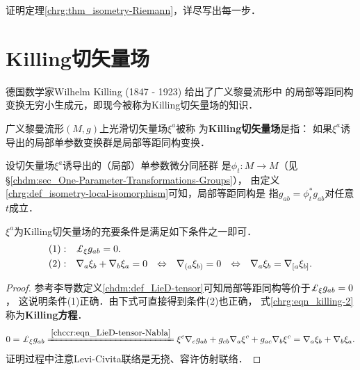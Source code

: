 \begin{exercise}
	证明定理\ref{chrg:thm_isometry-Riemann}，详尽写出每一步．
\end{exercise}



\section{Killing切矢量场}\label{chrg:sec_killing}
德国数学家Wilhelm Killing (1847 - 1923) 给出了广义黎曼流形中
的局部等距同构变换无穷小生成元，即现今被称为{Killing切矢量场}的知识．

\begin{definition}\label{chrg:def_killing}
    广义黎曼流形$(M,g)$上光滑切矢量场$\xi^a$被称
    为{\bfseries \heiti Killing切矢量场}是指：
    如果$\xi^a$诱导出的局部单参数变换群是局部等距同构变换．
\end{definition}
设切矢量场$\xi^a$诱导出的（局部）单参数微分同胚群
是$\phi_{t}:M\to M$（见\S\ref{chdm:sec_One-Parameter-Transformations-Groups}），
由定义\ref{chrg:def_isometry-local-isomorphism}可知，局部等距同构是
指$g_{ab}=\phi_t^{*}g_{ab}$对任意$t$成立．

\begin{theorem}\label{chrg:thm_killing}
    $\xi^a$为Killing切矢量场的充要条件是满足如下条件之一即可．
    \begin{align}
        { (1)}:&\quad \Lie_{\xi} g_{ab} =0. \label{chrg:eqn_killing-1} \\
        { (2)}:&\quad \nabla_a \xi_b + \nabla_b \xi_a =0   {\quad \Leftrightarrow \quad}
        \nabla_{(a}\xi_{b)} =0   {\quad \Leftrightarrow \quad}
        \nabla_{a}\xi_{b} =\nabla_{[a}\xi_{b]}. \label{chrg:eqn_killing-2} 
    \end{align}
\end{theorem}
\begin{proof}
    参考李导数定义\eqref{chdm:def_LieD-tensor}可知局部等距同构等价于$\Lie_{\xi} g_{ab} =0$，
    这说明条件(1)正确．由下式可直接得到条件(2)也正确，
    式\eqref{chrg:eqn_killing-2}称为{\bfseries \heiti Killing方程}．
    \begin{equation*}
        0=\Lie_{\xi} g_{ab}\xlongequal{\ref{chccr:eqn_LieD-tensor-Nabla}} \xi^c \nabla_c g_{ab}+
         g_{cb} \nabla_a \xi^c + g_{ac} \nabla_b \xi^c = \nabla_a \xi_b + \nabla_b \xi_a .
    \end{equation*}
    证明过程中注意Levi-Civita联络是无挠、容许仿射联络．
\end{proof}

